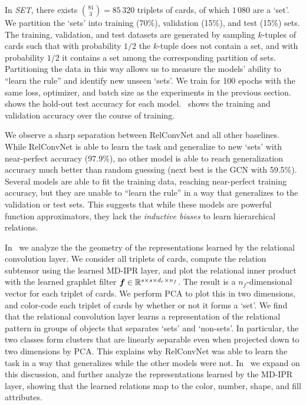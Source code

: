 
In \textit{SET}, there exists $\binom{81}{3} = 85\,320$ triplets of cards, of which $1\,080$ are a `set'. We partition the `sets' into training (70\%), validation (15\%), and test (15\%) sets. The training, validation, and test datasets are generated by sampling $k$-tuples of cards such that with probability $1/2$ the $k$-tuple does not contain a set, and with probability $1/2$ it contains a set among the corresponding partition of sets. Partitioning the data in this way allows us to measure the models' ability to ``learn the rule'' and identify new unseen `sets'.
We train for 100 epochs with the same loss, optimizer, and batch size as the experiments in the previous section.
 shows the hold-out test accuracy for each model.~ shows the training and validation accuracy over the course of training.

We observe a sharp separation between RelConvNet and all other baselines. While RelConvNet is able to learn the task and generalize to new `sets' with near-perfect accuracy (97.9\%), no other model is able to reach generalization accuracy much better than random guessing (next best is the GCN with 59.5\%). Several models are able to fit the training data, reaching near-perfect training accuracy, but they are unable to ``learn the rule'' in a way that generalizes to the validation or test sets. This suggests that while these models are powerful function approximators, they lack the \textit{inductive biases} to learn hierarchical relations.

In~ we analyze the the geometry of the representations learned by the relational convolution layer. We consider all triplets of cards, compute the relation subtensor using the learned MD-IPR layer, and plot the relational inner product with the learned graphlet filter $\bm{f} \in \mathbb{R}^{s \times s \times d_r \times n_f}$. The result is a $n_f$-dimensional vector for each triplet of cards. We perform PCA to plot this in two dimensions, and color-code each triplet of cards by whether or not it forms a `set'. We find that the relational convolution layer learns a representation of the relational pattern in groups of objects that separates `sets' and `non-sets'. In particular, the two classes form clusters that are linearly separable even when projected down to two dimensions by PCA. This explains why RelConvNet was able to learn the task in a way that generalizes while the other models were not. In~ we expand on this discussion, and further analyze the representations learned by the MD-IPR layer, showing that the learned relations map to the color, number, shape, and fill attributes.

